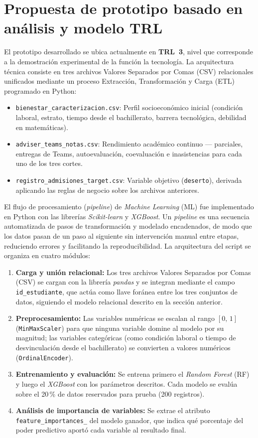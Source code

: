 \documentclass[12pt,letterpaper]{article}
\newcommand{\ML}{\textit{Machine Learning} (ML)\xspace}
\newcommand{\RF}{\textit{Random Forest} (RF)\xspace}
\newcommand{\XGB}{\textit{XGBoost}\xspace}
\newcommand{\ETL}{Extracción, Transformación y Carga (ETL)\xspace}
\newcommand{\CSV}{Valores Separados por Comas (CSV)\xspace}
\begin{document}
\newpage

\section{Propuesta de prototipo basado en análisis y modelo TRL}

El prototipo desarrollado se ubica actualmente en \textbf{TRL~3}, nivel que corresponde a la demostración experimental de la función la tecnología. La arquitectura técnica consiste en tres archivos \CSV relacionales unificados mediante un proceso \ETL programado en Python:

\begin{itemize}
  \item \texttt{bienestar\_caracterizacion.csv}: Perfil socioeconómico inicial (condición laboral, estrato, tiempo desde el bachillerato, barrera tecnológica, debilidad en matemáticas).
  \item \texttt{adviser\_teams\_notas.csv}: Rendimiento académico continuo — parciales, entregas de Teams, autoevaluación, coevaluación e inasistencias para cada uno de los tres cortes.
  \item \texttt{registro\_admisiones\_target.csv}: Variable objetivo (\texttt{deserto}), derivada aplicando las reglas de negocio sobre los archivos anteriores.
\end{itemize}

El flujo de procesamiento (\textit{pipeline}) de \ML fue implementado en Python con las librerías \textit{Scikit-learn} y \textit{XGBoost}. Un \textit{pipeline} es una secuencia automatizada de pasos de transformación y modelado encadenados, de modo que los datos pasan de un paso al siguiente sin intervención manual entre etapas, reduciendo errores y facilitando la reproducibilidad. La arquitectura del script se organiza en cuatro módulos:

\begin{enumerate}
  \item \textbf{Carga y unión relacional:} Los tres archivos \CSV se cargan con la librería \textit{pandas} y se integran mediante el campo \texttt{id\_estudiante}, que actúa como llave foránea entre los tres conjuntos de datos, siguiendo el modelo relacional descrito en la sección anterior.
  \item \textbf{Preprocesamiento:} Las variables numéricas se escalan al rango $[0,\,1]$ (\texttt{MinMaxScaler}) para que ninguna variable domine al modelo por su magnitud; las variables categóricas (como condición laboral o tiempo de desvinculación desde el bachillerato) se convierten a valores numéricos (\texttt{OrdinalEncoder}).
  \item \textbf{Entrenamiento y evaluación:} Se entrena primero el \RF y luego el \XGB con los parámetros descritos. Cada modelo se evalúa sobre el 20\,\% de datos reservados para prueba (200 registros).
  \item \textbf{Análisis de importancia de variables:} Se extrae el atributo \texttt{feature\_importances\_} del modelo ganador, que indica qué porcentaje del poder predictivo aportó cada variable al resultado final.
\end{enumerate}
\end{document}
